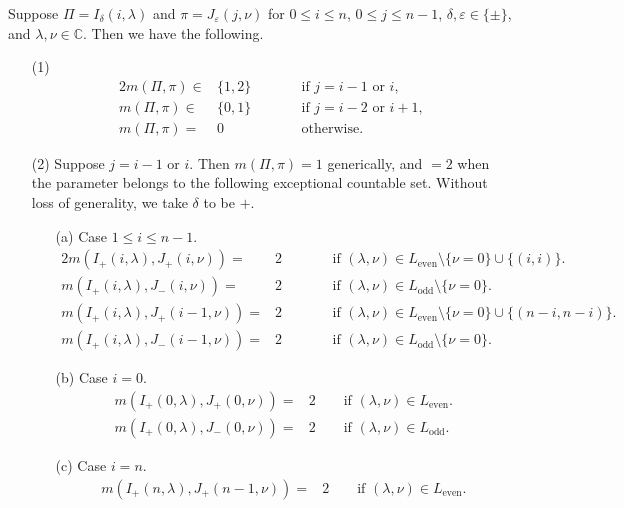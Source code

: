 \begin{theorem}
Suppose $\Pi=I_{\delta}(i,\lambda)$
 and $\pi=J_{\varepsilon}(j,\nu)$
 for $0 \le i\le n$, $0 \le j \le n-1$,
 $\delta, \varepsilon \in \{\pm \}$, 
 and $\lambda,\nu \in {\mathbb{C}}$.  
Then 
we have the following.  
\begin{enumerate}
\item[{\rm{(1)}}]
\begin{alignat*}{2}
m(\Pi,\pi) \in &\{ 1,2 \} \qquad
&&\text{if $j=i-1$ or $i$}, 
\\
m(\Pi,\pi) \in &\{ 0,1 \} \qquad
&&\text{if $j=i-2$ or $i+1$}, 
\\
m(\Pi,\pi) =& 0 \qquad
&&\text{otherwise}.  
\end{alignat*}
\item[{\rm{(2)}}]
Suppose $j=i-1$ or $i$.  
Then $m(\Pi,\pi)=1$ generically,
 and $=2$ when the parameter belongs to the following exceptional 
 countable set.  
Without loss of generality,
 we take $\delta$ to be $+$.  
\begin{enumerate}
\item[{\rm{(a)}}]
Case $1 \le i \le n-1$.
\begin{alignat*}{2}
m(I_+(i,\lambda), J_+(i,\nu))
=
&2
\qquad
&&\text{if }
(\lambda, \nu) \in L_{\operatorname{even}}\setminus \{\nu=0\}
                   \cup \{(i,i)\}.   
\\
m(I_+(i,\lambda), J_-(i,\nu))
=
&2
&&\text{if }
(\lambda, \nu) \in L_{\operatorname{odd}}\setminus \{\nu=0\}.   
\\
m(I_+(i,\lambda), J_+(i-1,\nu))
=
&2
&&
\text{if }
(\lambda, \nu) \in L_{\operatorname{even}}\setminus \{\nu=0\} 
                   \cup \{(n-i,n-i)\}.   
\\
m(I_+(i,\lambda), J_-(i-1,\nu))
=
&2
&&
\text{if }
(\lambda, \nu) \in L_{\operatorname{odd}}\setminus \{\nu=0\}.   
\end{alignat*}
\item[{\rm{(b)}}]
Case $i=0$.  
\begin{align*}
m(I_+(0,\lambda), J_+(0,\nu))
=&
2
\qquad
\text{if }
(\lambda, \nu) \in L_{\operatorname{even}}.   
\\
m(I_+(0,\lambda), J_-(0,\nu))
=&
2
\qquad
\text{if }
(\lambda, \nu) \in L_{\operatorname{odd}}.   
\end{align*}
\item[{\rm{(c)}}]
Case $i=n$.  
\begin{align*}
m(I_+(n,\lambda), J_+(n-1,\nu))
=&
2
\qquad
\text{if }
(\lambda, \nu) \in L_{\operatorname{even}}.   

\end{align*}
\end{enumerate}
\end{enumerate}
\end{theorem}
